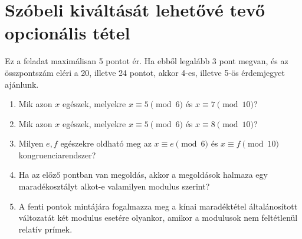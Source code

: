 \documentclass[11pt,a4paper]{article}
\begin{document}
\section{Szóbeli kiváltását lehetővé tevő opcionális tétel}
Ez a feladat maximálisan 5 pontot ér. Ha ebből legalább 3 pont megvan, és az összpontszám eléri a 20, illetve 24 pontot, akkor 4-es, illetve 5-ös érdemjegyet ajánlunk.
\begin{enumerate}

\item Mik azon $x$ egészek, melyekre $x\equiv 5\pmod{6}$ és $x\equiv 7 \pmod{10}$?
\item Mik azon $x$ egészek, melyekre $x\equiv 5\pmod{6}$ és $x\equiv 8 \pmod{10}$?
\item Milyen $e, f$ egészekre oldható meg az $x\equiv e\pmod{6}$ és $x\equiv f \pmod{10}$ kongruenciarendszer? 
\item Ha az előző pontban van megoldás, akkor a megoldások halmaza egy maradékosztályt alkot-e valamilyen modulus szerint?
\item A fenti pontok mintájára fogalmazza meg a kínai maradéktétel általánosított változatát két modulus esetére olyankor, amikor a modulusok nem feltétlenül relatív prímek.

\end{enumerate}
\end{document}
